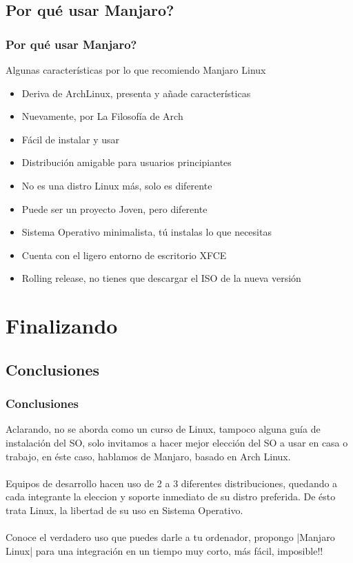 \documentclass[9pt,t]{beamer}
\begin{document}
\subsection{Por qué usar Manjaro?}
\begin{frame}\justifying
  \frametitle{Por qué usar Manjaro?}
    Algunas características por lo que recomiendo Manjaro Linux
	\begin{itemize}\justifying
	\item Deriva de ArchLinux, presenta y añade características
    \item Nuevamente, por La Filosofía de Arch
    \item Fácil de instalar y usar
	\item Distribución amigable para usuarios principiantes
	\item No es una distro Linux más, solo es diferente
    \item Puede ser un proyecto Joven, pero diferente
    \item Sistema Operativo minimalista, tú instalas lo que necesitas
    \item Cuenta con el ligero entorno de escritorio XFCE
	\item Rolling release, no tienes que descargar el ISO de la nueva versión
	\end{itemize}
\end{frame}


\section{Finalizando}

\subsection{Conclusiones}
\begin{frame}\justifying
  \frametitle{Conclusiones}
    Aclarando, no se aborda como un curso de Linux, tampoco alguna guía de instalación del SO, solo invitamos a
    hacer mejor elección del SO a usar en casa o trabajo, en éste caso, hablamos de Manjaro, basado en Arch Linux.
    \ \\ \ \\
    Equipos de desarrollo hacen uso de 2 a 3 diferentes distribuciones, quedando a cada integrante la eleccion y 
    soporte inmediato de su distro preferida. De ésto trata Linux, la libertad de su uso en Sistema Operativo.
    \ \\ \ \\
    Conoce el verdadero uso que puedes darle a tu ordenador, propongo |Manjaro Linux| para una integración en
    un tiempo muy corto, más fácil, imposible!!
  
\end{frame}
\end{document}
